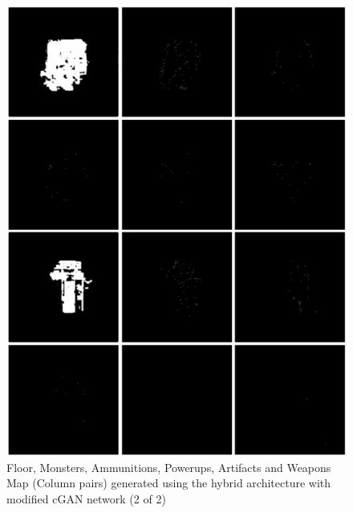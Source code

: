 \documentclass{Configuration_Files/PoliMi3i_thesis}
\begin{document}
\begin{figure}[H]
    \centering
    \includegraphics[width=1\textwidth]{mod_cgan_sample2.jpg}
    \caption[Samples generated using the modified cGAN network (2 of 2)]{Floor, Monsters, Ammunitions, Powerups, Artifacts and Weapons Map 
(Column pairs) generated using the hybrid architecture with modified cGAN network (2 of 2)}
    \label{fig:modcgansample2}
\end{figure}
\end{document}
